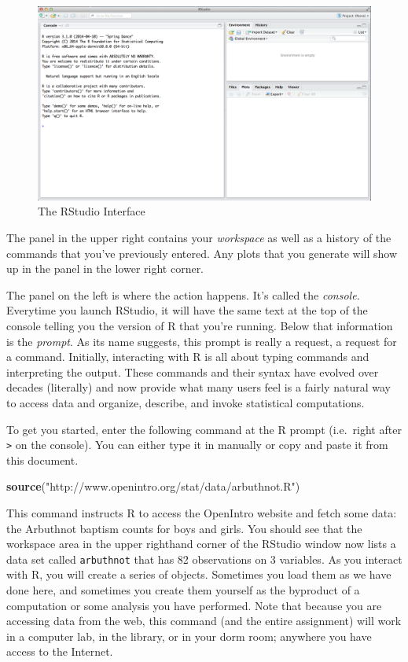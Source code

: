 \documentclass[]{book}
\newenvironment{Shaded}{\begin{snugshade}}{\end{snugshade}}
\newcommand{\KeywordTok}[1]{\textcolor[rgb]{0.13,0.29,0.53}{\textbf{#1}}}
\newcommand{\StringTok}[1]{\textcolor[rgb]{0.31,0.60,0.02}{#1}}
\newcommand{\NormalTok}[1]{#1}
\theoremstyle{definition}
\theoremstyle{definition}
\theoremstyle{definition}
\theoremstyle{remark}
\begin{document}
\begin{figure}
\centering
\includegraphics{./assets/images/02-01.png}
\caption{The RStudio Interface}
\end{figure}

The panel in the upper right contains your \emph{workspace} as well as a
history of the commands that you've previously entered. Any plots that
you generate will show up in the panel in the lower right corner.

The panel on the left is where the action happens. It's called the
\emph{console}. Everytime you launch RStudio, it will have the same text
at the top of the console telling you the version of R that you're
running. Below that information is the \emph{prompt}. As its name
suggests, this prompt is really a request, a request for a command.
Initially, interacting with R is all about typing commands and
interpreting the output. These commands and their syntax have evolved
over decades (literally) and now provide what many users feel is a
fairly natural way to access data and organize, describe, and invoke
statistical computations.

To get you started, enter the following command at the R prompt
(i.e.~right after \texttt{\textgreater{}} on the console). You can
either type it in manually or copy and paste it from this document.

\begin{Shaded}
\begin{Highlighting}[]
\KeywordTok{source}\NormalTok{(}\StringTok{"http://www.openintro.org/stat/data/arbuthnot.R"}\NormalTok{)}
\end{Highlighting}
\end{Shaded}

This command instructs R to access the OpenIntro website and fetch some
data: the Arbuthnot baptism counts for boys and girls. You should see
that the workspace area in the upper righthand corner of the RStudio
window now lists a data set called \texttt{arbuthnot} that has 82
observations on 3 variables. As you interact with R, you will create a
series of objects. Sometimes you load them as we have done here, and
sometimes you create them yourself as the byproduct of a computation or
some analysis you have performed. Note that because you are accessing
data from the web, this command (and the entire assignment) will work in
a computer lab, in the library, or in your dorm room; anywhere you have
access to the Internet.
\end{document}
